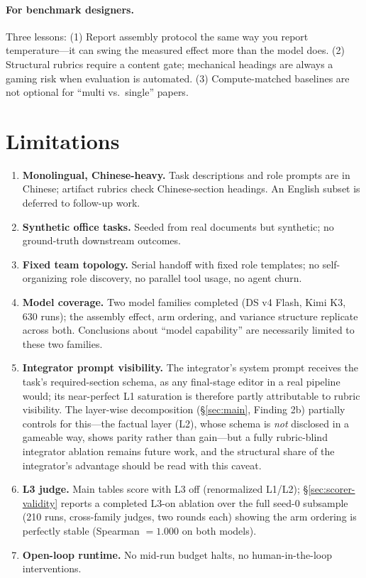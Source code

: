 \documentclass[sigconf,anonymous]{aamas}
\begin{document}
\paragraph{For benchmark designers.} Three lessons: (1) Report assembly protocol the same way you report temperature---it can swing the measured effect more than the model does. (2) Structural rubrics require a content gate; mechanical headings are always a gaming risk when evaluation is automated. (3) Compute-matched baselines are not optional for ``multi vs.\ single'' papers.

\section{Limitations}
\label{sec:limitations}

\begin{enumerate}
\item \textbf{Monolingual, Chinese-heavy.} Task descriptions and role prompts are in Chinese; artifact rubrics check Chinese-section headings. An English subset is deferred to follow-up work.
\item \textbf{Synthetic office tasks.} Seeded from real documents but synthetic; no ground-truth downstream outcomes.
\item \textbf{Fixed team topology.} Serial handoff with fixed role templates; no self-organizing role discovery, no parallel tool usage, no agent churn.
\item \textbf{Model coverage.} Two model families completed (DS v4 Flash, Kimi K3, 630 runs); the assembly effect, arm ordering, and variance structure replicate across both. Conclusions about ``model capability'' are necessarily limited to these two families.
\item \textbf{Integrator prompt visibility.} The integrator's system prompt receives the task's required-section schema, as any final-stage editor in a real pipeline would; its near-perfect L1 saturation is therefore partly attributable to rubric visibility. The layer-wise decomposition (\S\ref{sec:main}, Finding 2b) partially controls for this---the factual layer (L2), whose schema is \emph{not} disclosed in a gameable way, shows parity rather than gain---but a fully rubric-blind integrator ablation remains future work, and the structural share of the integrator's advantage should be read with this caveat.
\item \textbf{L3 judge.} Main tables score with L3 off (renormalized L1/L2); \S\ref{sec:scorer-validity} reports a completed L3-on ablation over the full seed-0 subsample (210 runs, cross-family judges, two rounds each) showing the arm ordering is perfectly stable (Spearman $= 1.000$ on both models).
\item \textbf{Open-loop runtime.} No mid-run budget halts, no human-in-the-loop interventions.
\end{enumerate}
\end{document}
